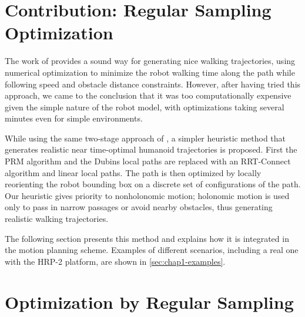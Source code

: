 \section{Contribution: Regular Sampling Optimization}
\label{sec:chap1-contribution}

The work of \cite{moul10} provides a sound way for generating nice
walking trajectories, using numerical optimization to minimize the
robot walking time along the path while following speed and obstacle
distance constraints. However, after having tried this approach, we
came to the conclusion that it was too computationally expensive given
the simple nature of the robot model, with optimizations taking
several minutes even for simple environments.

While using the same two-stage approach of \cite{yosh08}, a simpler
heuristic method that generates realistic near time-optimal humanoid
trajectories is proposed. First the PRM algorithm and the Dubins local
paths are replaced with an RRT-Connect algorithm and linear local
paths. The path is then optimized by locally reorienting the robot
bounding box on a discrete set of configurations of the path. Our
heuristic gives priority to nonholonomic motion; holonomic motion is
used only to pass in narrow passages or avoid nearby obstacles, thus
generating realistic walking trajectories.

The following section presents this method and explains how it is
integrated in the motion planning scheme. Examples of different
scenarios, including a real one with the HRP-2 platform, are shown in
\autoref{sec:chap1-examples}.

\section{Optimization by Regular Sampling}
\label{sec:chap1-regular-sampling-optim}

